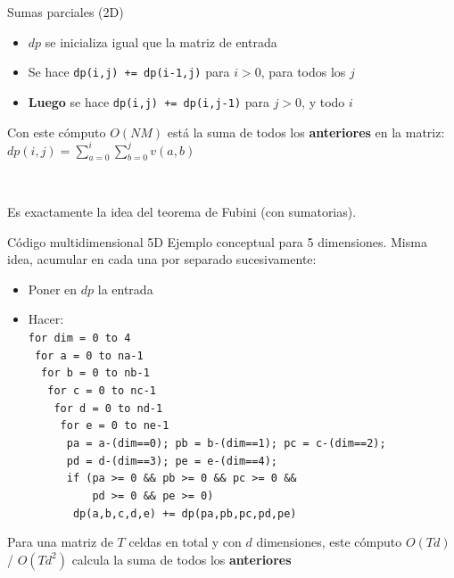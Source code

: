 \documentclass{beamer}
\begin{document}
\begin{frame}{Sumas parciales (2D)}
    \begin{itemize}
		\item $dp$ se inicializa igual que la matriz de entrada
        \item Se hace \texttt{dp(i,j) += dp(i-1,j)} para $i > 0$, para todos los $j$
        \item \textbf{Luego} se hace \texttt{dp(i,j) += dp(i,j-1)} para $j > 0$, y todo $i$
    \end{itemize}
    Con este cómputo $O(NM)$ está la suma de todos los \textbf{anteriores} en la matriz: $dp(i,j) = \sum_{a=0}^{i} \sum_{b=0}^{j}{v(a,b)}$
    
    \ 
    
    Es exactamente la idea del teorema de Fubini (con sumatorias).
\end{frame}

\begin{frame}{Código multidimensional 5D}
    Ejemplo conceptual para 5 dimensiones. Misma idea, acumular en cada una por separado sucesivamente:
    \begin{itemize}
		\item Poner en $dp$ la entrada
        \item Hacer:\\
        \footnotesize
        \texttt{for dim = 0 to 4}\\
        \texttt{\ for a = 0 to na-1}\\
        \texttt{\ \ for b = 0 to nb-1}\\
        \texttt{\ \ \ for c = 0 to nc-1}\\
        \texttt{\ \ \ \ for d = 0 to nd-1}\\
        \texttt{\ \ \ \ \ for e = 0 to ne-1}\\
        \texttt{\ \ \ \ \ \ pa = a-(dim==0); pb = b-(dim==1); pc = c-(dim==2);}\\
        \texttt{\ \ \ \ \ \ pd = d-(dim==3); pe = e-(dim==4);}\\
        \texttt{\ \ \ \ \ \ if (pa >= 0 \&\& pb >= 0 \&\& pc >= 0 \&\&}\\
        \texttt{\ \ \ \ \ \ \ \ \ \ pd >= 0 \&\& pe >= 0)}\\
        \texttt{\ \ \ \ \ \ \ dp(a,b,c,d,e) += dp(pa,pb,pc,pd,pe)}\\
    \end{itemize}
    Para una matriz de $T$ celdas en total y con $d$ dimensiones, este cómputo $O(T d)$ / $O(T d^2)$ calcula la suma de todos los \textbf{anteriores}
    
    
\end{frame}
\end{document}

